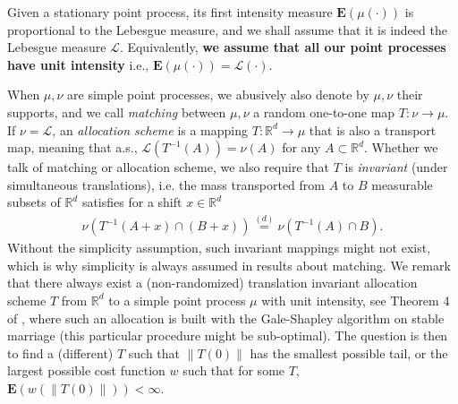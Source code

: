 \documentclass[12pt]{article}
\newcommand{\Leb}{\mathcal{L}}
\newcommand{\equlaw}{\stackrel{(d)}{=}}
\newcommand{\1}{\mathbf{1}}
\begin{document}
 {Given a stationary point process, its first intensity measure $\mathbf{E}(\mu(\cdot))$ is proportional to the Lebesgue measure, and we shall assume that it is indeed the Lebesgue measure $ \Leb.$ Equivalently, {\bf we assume that all our point processes have unit intensity} i.e., $\mathbf{E}(\mu(\cdot)) = \Leb(\cdot).$ }

When $ \mu ,\nu $ are  {simple} point processes, {we abusively also denote by $ \mu ,\nu$ their supports}, and we call {\it matching} between $ \mu ,\nu $ a random one-to-one {map $ T:\nu \to \mu $.} If {$ \nu   = \Leb$, an {\it allocation scheme}  is a mapping $ T:\mathbb{R}^{d}\to     \mu$} that is also a transport map, meaning that a.s., $ \Leb(T^{-1}(A)) = \nu (A)$ for any $ A\subset \mathbb{R}^{d}$.
Whether we talk of matching or allocation scheme, we also require that $ T$ is  {\it invariant } (under simultaneous translations), i.e. the mass transported from $A$ to $B$ measurable subsets of $ \mathbb{R}^{d}$ satisfies for a shift $x\in  \mathbb R  ^{d}$ \begin{align*} \nu ( T^{-1}(A + x)\cap (B + x) ) \equlaw \nu ( T^{-1}(A)\cap B ).
\end{align*}{Without the simplicity assumption, such invariant mappings might not exist, which is why simplicity is always assumed in results about matching}. We remark that there always exist a (non-randomized) translation invariant allocation scheme $ T$ from $ \mathbb{R}^{d}$ to a simple point process $ \mu $ with  {unit} intensity, see Theorem 4 of \cite{hoffman2006stable}, where such an allocation is built with the Gale-Shapley algorithm on stable marriage (this particular procedure might be sub-optimal). The question is then to find a (different) $ T$ such that $ \|T(0)\|$ has the smallest  possible tail, or the largest possible cost function $ w$ such that for some $ T,$ $ \mathbf{E}(w(\|T(0)\|))<\infty $.
\end{document}
